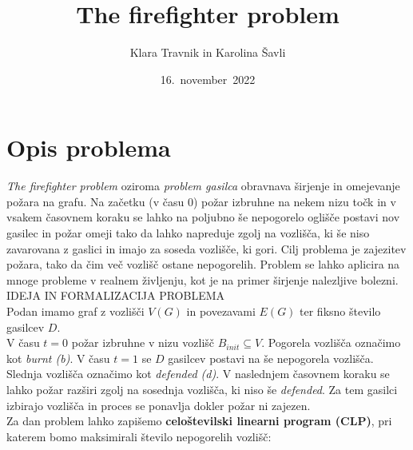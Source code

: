 \documentclass[a4paper, 11pt]{article}
\title{\textbf{\LARGE{The firefighter problem}}}
\author{Klara Travnik in Karolina Šavli}
\date{16.\ november\ 2022}
\begin{document}
\maketitle

\section{Opis problema}

\noindent \emph{The firefighter problem} oziroma \emph{problem gasilca} obravnava širjenje in omejevanje požara
na grafu. Na začetku (v času $0$) požar izbruhne na nekem nizu točk in v vsakem časovnem
koraku se lahko na poljubno še nepogorelo oglišče postavi nov gasilec in požar omeji tako da lahko
napreduje zgolj na vozlišča, ki še niso zavarovana z gaslici in imajo za soseda vozlišče, ki gori.
Cilj problema je zajezitev požara, tako da čim več vozlišč ostane nepogorelih. 
Problem se lahko aplicira na mnoge probleme v realnem življenju, kot je 
na primer širjenje nalezljive bolezni. \\

\noindent IDEJA IN FORMALIZACIJA PROBLEMA \\
Podan imamo graf z vozlišči $V\left(G\right)$ in povezavami $E\left(G\right)$ ter 
fiksno število gasilcev $D$. \\
V času $t = 0$ požar izbruhne v nizu vozlišč $B_{init} \subseteq V$. Pogorela vozlišča
označimo kot \emph{burnt (b)}.
V času $t = 1$ se $D$ gasilcev postavi na še nepogorela vozlišča. Slednja vozlišča 
označimo kot \emph{defended (d)}.
V naslednjem časovnem koraku se lahko požar razširi zgolj na sosednja vozlišča, ki niso še \emph{defended}.
Za tem gasilci izbirajo vozlišča in proces se ponavlja dokler požar ni zajezen. \\
Za dan problem lahko zapišemo \textbf{celoštevilski linearni program (CLP)}, pri katerem
bomo maksimirali število nepogorelih vozlišč:
\end{document}
